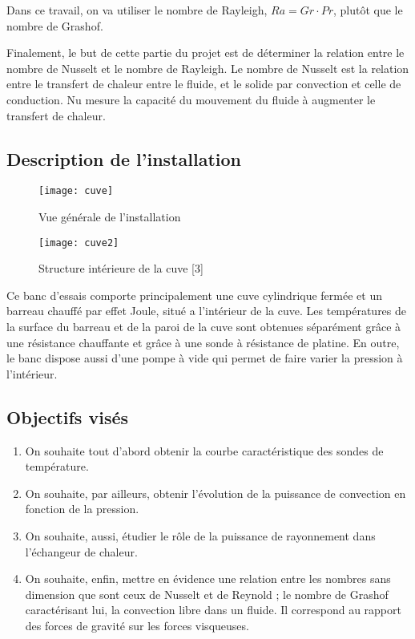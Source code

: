 \documentclass[14pt]{article}
\begin{document}
Dans ce travail, on va utiliser le nombre de Rayleigh, $Ra=Gr\cdot Pr$, plutôt que le nombre de Grashof.

Finalement, le but de cette partie du projet est de déterminer la relation entre le nombre de Nusselt et le nombre de Rayleigh. Le nombre de Nusselt est la relation entre le transfert de chaleur entre le fluide, et le solide par convection et celle de conduction. Nu mesure la capacité du mouvement du fluide à augmenter le transfert de chaleur.
\newpage
\subsection{Description de l'installation}
\begin{figure}[h]
\begin{center}
		\begin{minipage}[h]{0.4\linewidth}
			\texttt{[image: cuve]}
			\caption{Vue générale de l'installation}
		\end{minipage}
	\hfill
		\begin{minipage}[h]{0.4\linewidth}
			\texttt{[image: cuve2]}	
			\caption{Structure intérieure de la cuve [3]}
		\end{minipage}
\end{center}
\end{figure}


Ce banc d’essais comporte principalement une cuve cylindrique fermée et un barreau chauffé par effet Joule, situé a l’intérieur de la cuve. Les températures de la surface du barreau et de la paroi de la cuve sont obtenues séparément grâce à une résistance chauffante et grâce à une sonde à résistance de platine. En outre, le banc dispose aussi d’une pompe à vide qui permet de faire varier la pression à l’intérieur.
\subsection{Objectifs visés}
\begin{enumerate}
	\item On souhaite tout d'abord obtenir la courbe caractéristique des sondes de température.
	\item On souhaite, par ailleurs, obtenir l’évolution de la puissance de convection en fonction de la pression.
	\item On souhaite, aussi, étudier le rôle de la puissance de rayonnement dans l’échangeur de chaleur.
	\item On souhaite, enfin, mettre en évidence une relation entre les nombres sans dimension que sont ceux de Nusselt et de Reynold ; le nombre de Grashof caractérisant lui, la convection libre dans un fluide. Il correspond au rapport des forces de gravité sur les forces visqueuses. 
\end{enumerate}
\end{document}
